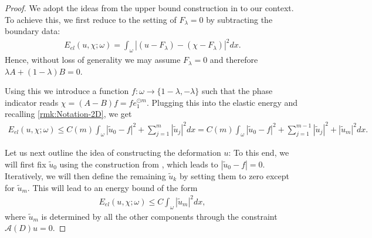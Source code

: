 \documentclass[a4paper, 10pt, twoside, notitlepage]{amsart}
\theoremstyle{plain}
\newcommand{\A}{\mathcal{A}}
\begin{document}
		\begin{proof}
			We adopt the ideas from the upper bound construction in \cite{CC15} to our context.  To achieve this, we first reduce to the setting of $F_\lambda = 0$ by subtracting the boundary data:
			\begin{align*}
				E_{el}(u,\chi;\omega) = \int_{\omega} |(u-F_\lambda) - (\chi-F_\lambda)|^2 dx.
			\end{align*}
			Hence, without loss of generality we may assume $F_\lambda = 0$ and therefore $\lambda A + (1-\lambda) B = 0$.
			
			Using this we introduce a function $f:\omega \to \{1-\lambda,-\lambda\}$ such that the phase indicator reads $\chi = (A-B) f = f e_1^{\odot m}$.  Plugging this into the elastic energy and recalling \cref{rmk:Notation-2D}, we get
					\begin{align*}
				E_{el}(u,\chi;\omega) \leq C(m) \int_\omega |\tilde{u}_0 -f|^2 + \sum_{j=1}^m |\tilde{u}_j|^2 dx = C(m) \int_\omega |\tilde{u}_0 - f|^2 + \sum_{j=1}^{m-1} |\tilde{u}_j|^2 + |\tilde{u}_m|^2 dx.
			\end{align*}
			
			Let us next outline the idea of constructing the deformation $u$: To this end, we will first fix $\tilde{u}_0$ using the construction from \cite{CC15}, which leads to $|\tilde{u}_0 - f| =
			0$. Iteratively, we will then define the remaining $\tilde{u}_k$ by setting them to zero except for $\tilde{u}_m$.  This will lead to an energy bound of the form
			\begin{align*}
				E_{el}(u,\chi;\omega) \leq C \int_\omega |\tilde{u}_m|^2 dx,
			\end{align*}
			where $\tilde{u}_m$ is determined by all the other components through the constraint $\A(D) u = 0$.
			

\end{proof}
\end{document}
